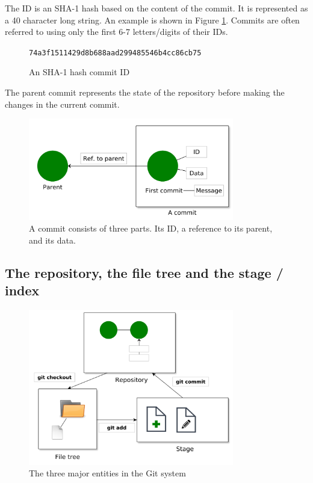\documentclass[../main/git_course_main.tex]{subfiles}
\begin{document}
The ID is an SHA-1 hash based on the content of the commit. It is represented as a 40 character long string. An example is shown in Figure \ref{fig:SHA}.
Commits are often referred to using only the first 6-7 letters/digits of their IDs.

\begin{figure}[h!]
\center\verb$74a3f1511429d8b688aad299485546b4cc86cb75$
\caption{An SHA-1 hash commit ID}
\label{fig:SHA}
\end{figure}

The parent commit represents the state of the repository before making the changes in the current commit.

\begin{figure}[h!]
	\centering
	\includegraphics[width=0.8\textwidth]{../visualizations/chapter2/21_the_commit.pdf}
	\caption{A commit consists of three parts. Its ID, a reference to its parent, and its data.}
	\label{fig:a_commit}
\end{figure}

\subsection{The repository, the file tree and the stage / index}


\begin{figure}[h!]
	\centering
	\includegraphics[width=0.8\textwidth]{../visualizations/chapter2/22_visualize_stage_file_system_and_repo.pdf}
	\caption{The three major entities in the Git system}
	\label{fig:repo_filetree_stage}
\end{figure}
\end{document}
